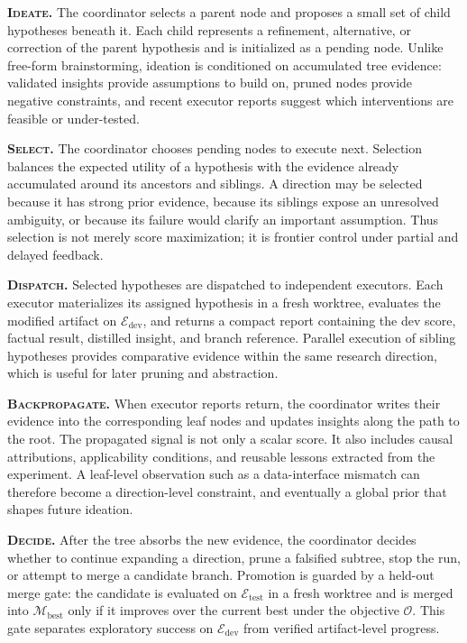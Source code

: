 \documentclass[]{selfevolagent}
\theoremstyle{plain}
\theoremstyle{definition}
\theoremstyle{remark}
\newcommand{\Mat}{\mathcal{M}}
\newcommand{\Obj}{\mathcal{O}}
\newcommand{\Eval}{\mathcal{E}}
\newcommand{\dev}{\mathrm{dev}}
\newcommand{\test}{\mathrm{test}}
\begin{document}
\textbf{\textsc{Ideate}.}
The coordinator selects a parent node and proposes a small set of child
hypotheses beneath it. Each child represents a refinement, alternative, or
correction of the parent hypothesis and is initialized as a pending node. Unlike
free-form brainstorming, ideation is conditioned on accumulated tree evidence:
validated insights provide assumptions to build on, pruned nodes provide
negative constraints, and recent executor reports suggest which interventions
are feasible or under-tested.

\textbf{\textsc{Select}.}
The coordinator chooses pending nodes to execute next. Selection balances the
expected utility of a hypothesis with the evidence already accumulated around
its ancestors and siblings. A direction may be selected because it has strong
prior evidence, because its siblings expose an unresolved ambiguity, or because
its failure would clarify an important assumption. Thus selection is not merely
score maximization; it is frontier control under partial and delayed feedback.

\textbf{\textsc{Dispatch}.}
Selected hypotheses are dispatched to independent executors. Each executor
materializes its assigned hypothesis in a fresh worktree, evaluates the modified
artifact on $\Eval_{\dev}$, and returns a compact report containing the dev
score, factual result, distilled insight, and branch reference. Parallel
execution of sibling hypotheses provides comparative evidence within the same
research direction, which is useful for later pruning and abstraction.

\textbf{\textsc{Backpropagate}.}
When executor reports return, the coordinator writes their evidence into the
corresponding leaf nodes and updates insights along the path to the root. The
propagated signal is not only a scalar score. It also includes causal
attributions, applicability conditions, and reusable lessons extracted from the
experiment. A leaf-level observation such as a data-interface mismatch can
therefore become a direction-level constraint, and eventually a global prior
that shapes future ideation.

\textbf{\textsc{Decide}.}
After the tree absorbs the new evidence, the coordinator decides whether to
continue expanding a direction, prune a falsified subtree, stop the run, or
attempt to merge a candidate branch. Promotion is guarded by a held-out merge
gate: the candidate is evaluated on $\Eval_{\test}$ in a fresh worktree and is
merged into $\Mat_{\mathrm{best}}$ only if it improves over the current best
under the objective $\Obj$. This gate separates exploratory success on
$\Eval_{\dev}$ from verified artifact-level progress.
\end{document}
